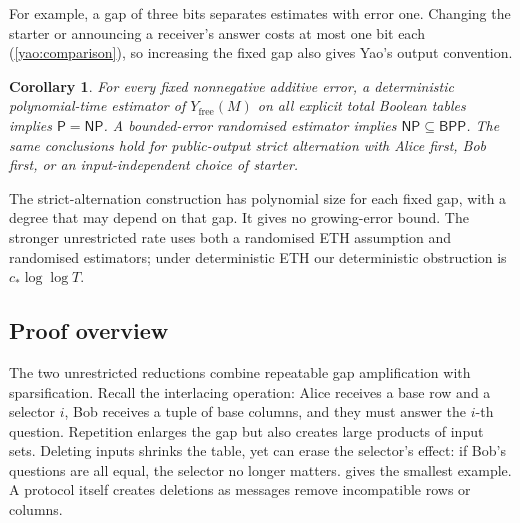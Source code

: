 \documentclass[11pt]{article} \usepackage[utf8]{inputenc}
\theoremstyle{plain} \newtheorem{theorem}{Theorem}[section]
\newtheorem{corollary}[corollary]{Corollary} \aliascntresetthe{corollary}
\theoremstyle{definition} \newaliascnt{definition}{theorem}
\newcommand{\NP}{\mathsf{NP}}
\newcommand{\BPP}{\mathsf{BPP}}
\begin{document}
For example, a gap of three bits separates estimates with error one.
Changing the starter or announcing a receiver's answer costs at most one
bit each (\cref{yao:comparison}), so increasing the fixed gap also gives
Yao's output convention.

\begin{corollary}\label{yao:bpp}
For every fixed nonnegative additive error, a deterministic polynomial-time
estimator of $Y_{\mathrm{free}}(M)$ on all explicit total Boolean tables
implies $\mathsf P=\NP$. A bounded-error randomised estimator implies
$\NP\subseteq\BPP$. The same conclusions hold for public-output strict
alternation with Alice first, Bob first, or an input-independent choice
of starter.
\end{corollary}

The strict-alternation construction has polynomial size for each fixed
gap, with a degree that may depend on that gap. It gives no growing-error
bound. The stronger unrestricted rate uses both a randomised ETH assumption
and randomised estimators; under deterministic ETH our deterministic
obstruction is $c_*\log\log T$.

\subsection{Proof overview}
\label{sec:overview}

The two unrestricted reductions combine repeatable gap amplification with
sparsification. Recall the interlacing operation: Alice receives a base row
and a selector $i$, Bob receives a tuple of base columns, and they must
answer the $i$-th question.
Repetition enlarges the gap but also creates large products of input sets.
Deleting inputs shrinks the table, yet can erase the selector's effect:
if Bob's questions are all equal, the selector no longer matters.
 gives the smallest example. A protocol itself creates
deletions as messages remove incompatible rows or columns.
\end{document}
